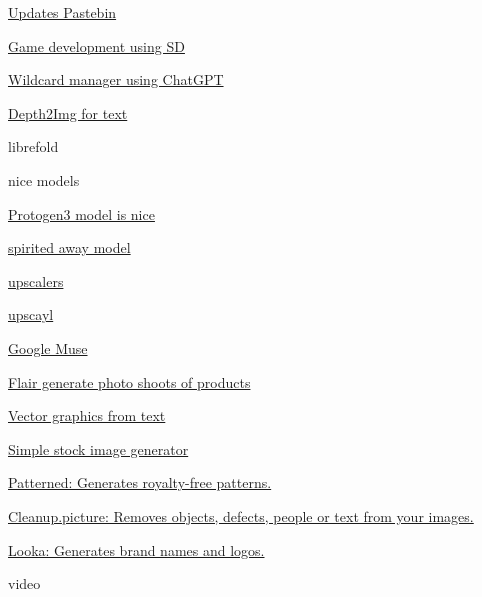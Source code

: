            
            \href{https://rentry.org/sdupdates3}{Updates Pastebin}
           
            \href{https://www.heroo.ai/}{Game development using SD}
           
            \href{https://github.com/mattjaybe/sd-wildcards}{Wildcard
            manager using ChatGPT}
           
            \href{https://www.reddit.com/r/StableDiffusion/comments/10c9kg8/depth2img_works_well_for_text_inputs/}{Depth2Img
            for text}
           
         
          librefold
         
          nice models

           
          \tightlist
           
            \href{https://www.reddit.com/r/StableDiffusion/comments/100tp0v/protogenx34_has_absolutely_amazing_detail/}{Protogen3
            model is nice}
           
            \href{https://civitai.com/models/5378/spirited-away-general-model-15}{spirited
            away model}
           
         
       
        \href{https://upscale.wiki/wiki/Model_Database}{upscalers}

         
        \tightlist
         
          \href{https://github.com/upscayl/upscayl}{upscayl}
         
       
        \href{https://www.infoq.com/news/2023/01/google-muse-text-to-image/}{Google
        Muse}
       
        \href{https://flair.ai/}{Flair generate photo shoots of
        products}
       
        \href{https://illustroke.com/}{Vector graphics from text}
       
        \href{https://stockimg.ai/}{Simple stock image generator}
       
        \href{https://www.patterned.ai/}{Patterned: Generates
        royalty-free patterns.}
       
        \href{https://cleanup.pictures/}{Cleanup.picture: Removes
        objects, defects, people or text from your images.}
       
        \href{https://looka.com/}{Looka: Generates brand names and
        logos.}
       
     
      video

       
      \tightlist
       
